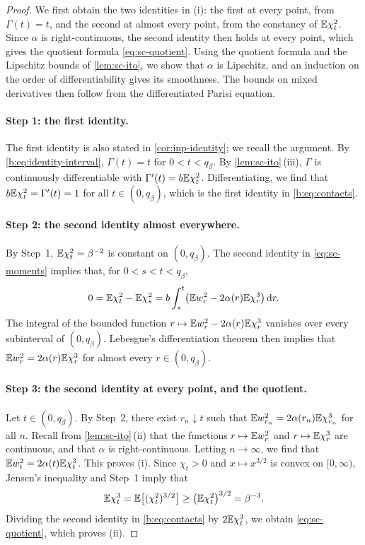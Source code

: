 \begin{proof}
We first obtain the two identities in (i): the first at every point, from
$\Gamma(t)=t$, and the second at almost every point, from the constancy of
$\mathbb E\chi_t^2$. Since $\alpha$ is right-continuous, the second identity then
holds at every point, which gives the quotient formula
\eqref{eq:sc-quotient}. Using the quotient formula and the Lipschitz bounds of
\cref{lem:sc-ito}, we show that $\alpha$ is Lipschitz, and an induction on the
order of differentiability gives its smoothness. The
bounds on mixed derivatives then follow from the differentiated Parisi
equation.

\paragraph{Step 1: the first identity.}
The first identity is also stated in \cref{cor:inp-identity}; we recall the
argument. By \eqref{b:eq:identity-interval}, $\Gamma(t)=t$ for
$0<t<q_\beta$. By \cref{lem:sc-ito}\,(iii), $\Gamma$ is continuously
differentiable with $\Gamma'(t)=b\mathbb E\chi_t^2$. Differentiating, we find that
$b\mathbb E\chi_t^2=\Gamma'(t)=1$ for all $t\in(0,q_\beta)$, which is the first
identity in \eqref{b:eq:contacts}.

\paragraph{Step 2: the second identity almost everywhere.}
By Step~1, $\mathbb E\chi_t^2=\beta^{-2}$ is constant on $(0,q_\beta)$. The
second identity in \eqref{eq:sc-moments} implies that, for $0<s<t<q_\beta$,
\[
 0=\mathbb E\chi_t^2-\mathbb E\chi_s^2
 =b\int_s^t\bigl(\mathbb E w_r^2-2\alpha(r)\mathbb E\chi_r^3\bigr)\,\mathrm d r.
\]
The integral of the bounded function
$r\mapsto\mathbb E w_r^2-2\alpha(r)\mathbb E\chi_r^3$ vanishes over every subinterval of
$(0,q_\beta)$. Lebesgue's differentiation theorem then implies that
$\mathbb E w_r^2=2\alpha(r)\mathbb E\chi_r^3$ for almost every $r\in(0,q_\beta)$.

\paragraph{Step 3: the second identity at every point, and the quotient.}
Let $t\in(0,q_\beta)$. By Step~2, there exist $r_n\downarrow t$ such that
$\mathbb E w_{r_n}^2=2\alpha(r_n)\mathbb E\chi_{r_n}^3$ for all $n$. Recall from \cref{lem:sc-ito}\,(ii) that the
functions $r\mapsto\mathbb E w_r^2$ and $r\mapsto\mathbb E\chi_r^3$ are continuous, and
that $\alpha$ is right-continuous. Letting $n\to\infty$, we find that
$\mathbb E w_t^2=2\alpha(t)\mathbb E\chi_t^3$. This proves (i). Since $\chi_t>0$ and
$x\mapsto x^{3/2}$ is convex on $[0,\infty)$, Jensen's inequality and Step~1
imply that
\[
 \mathbb E\chi_t^3=\mathbb E\bigl[(\chi_t^2)^{3/2}\bigr]\ge\bigl(\mathbb E\chi_t^2\bigr)^{3/2}
 =\beta^{-3}.
\]
Dividing the second identity in \eqref{b:eq:contacts} by $2\mathbb E\chi_t^3$, we
obtain \eqref{eq:sc-quotient}, which proves (ii).


\end{proof}
